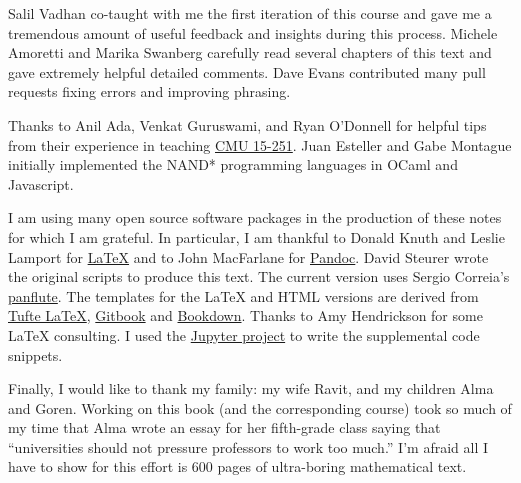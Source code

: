 Salil Vadhan co-taught with me the first iteration of this course and
gave me a tremendous amount of useful feedback and insights during this
process. Michele Amoretti and Marika Swanberg carefully read several
chapters of this text and gave extremely helpful detailed comments. Dave
Evans contributed many pull requests fixing errors and improving
phrasing.

Thanks to Anil Ada, Venkat Guruswami, and Ryan O'Donnell for helpful
tips from their experience in teaching
\href{http://www.cs.cmu.edu/~./15251/}{CMU 15-251}. Juan Esteller and
Gabe Montague initially implemented the NAND* programming languages in
OCaml and Javascript.

I am using many open source software packages in the production of these
notes for which I am grateful. In particular, I am thankful to Donald
Knuth and Leslie Lamport for
\href{https://www.latex-project.org/}{LaTeX} and to John MacFarlane for
\href{http://pandoc.org/}{Pandoc}. David Steurer wrote the original
scripts to produce this text. The current version uses Sergio Correia's
\href{http://scorreia.com/software/panflute/}{panflute}. The templates
for the LaTeX and HTML versions are derived from
\href{https://tufte-latex.github.io/tufte-latex/}{Tufte LaTeX},
\href{https://www.gitbook.com/}{Gitbook} and
\href{https://bookdown.org/}{Bookdown}. Thanks to Amy Hendrickson for
some LaTeX consulting. I used the \href{http://jupyter.org/}{Jupyter
project} to write the supplemental code snippets.

Finally, I would like to thank my family: my wife Ravit, and my children
Alma and Goren. Working on this book (and the corresponding course) took
so much of my time that Alma wrote an essay for her fifth-grade class
saying that ``universities should not pressure professors to work too
much.'' I'm afraid all I have to show for this effort is 600 pages of
ultra-boring mathematical text.
